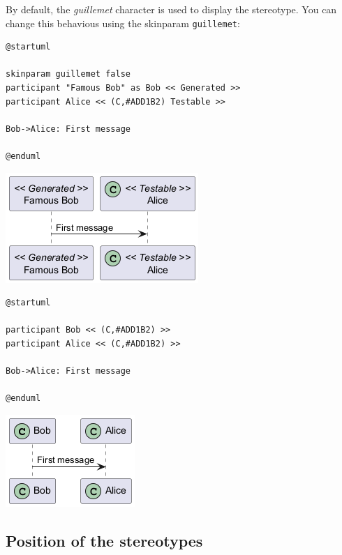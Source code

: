 By default, the \textit{guillemet} character is used to display the stereotype.
You can change this behavious using the skinparam \texttt{guillemet}:


\begin{verbatim}
@startuml

skinparam guillemet false
participant "Famous Bob" as Bob << Generated >>
participant Alice << (C,#ADD1B2) Testable >>

Bob->Alice: First message

@enduml
\end{verbatim}
\begin{center}
\includegraphics[scale=0.60]{imgw/img-a633b72a8cfb3d3857dff8c7a4d07ae1.png}
\end{center}


\begin{verbatim}
@startuml

participant Bob << (C,#ADD1B2) >>
participant Alice << (C,#ADD1B2) >>

Bob->Alice: First message

@enduml
\end{verbatim}
\begin{center}
\includegraphics[scale=0.60]{imgw/img-fcbe3a70f6c0dd0055400b8529d4ccc3.png}
\end{center}


%
%
\subsection{Position of the stereotypes}


